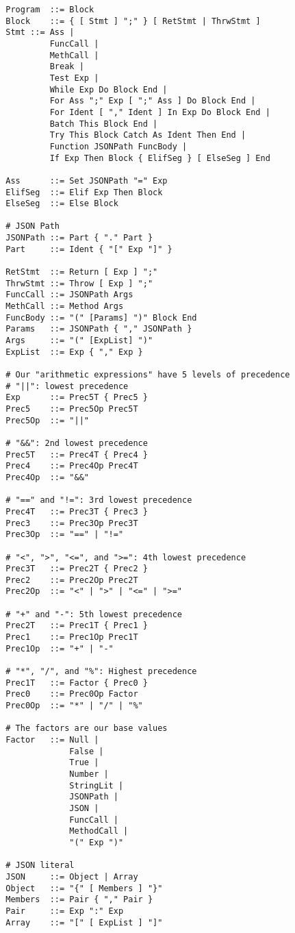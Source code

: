 \documentclass[12pt, letterpaper]{article}
\begin{document}
\begin{center}
    \begin{verbatim}
        Program  ::= Block
        Block    ::= { [ Stmt ] ";" } [ RetStmt | ThrwStmt ]
        Stmt ::= Ass |
                 FuncCall |
                 MethCall |
                 Break |
                 Test Exp |
                 While Exp Do Block End |
                 For Ass ";" Exp [ ";" Ass ] Do Block End |
                 For Ident [ "," Ident ] In Exp Do Block End |
                 Batch This Block End |
                 Try This Block Catch As Ident Then End |
                 Function JSONPath FuncBody |
                 If Exp Then Block { ElifSeg } [ ElseSeg ] End

        Ass      ::= Set JSONPath "=" Exp
        ElifSeg  ::= Elif Exp Then Block
        ElseSeg  ::= Else Block

        # JSON Path
        JSONPath ::= Part { "." Part }
        Part     ::= Ident { "[" Exp "]" }

        RetStmt  ::= Return [ Exp ] ";"
        ThrwStmt ::= Throw [ Exp ] ";"
        FuncCall ::= JSONPath Args
        MethCall ::= Method Args
        FuncBody ::= "(" [Params] ")" Block End
        Params   ::= JSONPath { "," JSONPath }
        Args     ::= "(" [ExpList] ")"
        ExpList  ::= Exp { "," Exp }

        # Our "arithmetic expressions" have 5 levels of precedence
        # "||": lowest precedence
        Exp      ::= Prec5T { Prec5 }
        Prec5    ::= Prec5Op Prec5T
        Prec5Op  ::= "||"

        # "&&": 2nd lowest precedence
        Prec5T   ::= Prec4T { Prec4 }
        Prec4    ::= Prec4Op Prec4T
        Prec4Op  ::= "&&"

        # "==" and "!=": 3rd lowest precedence
        Prec4T   ::= Prec3T { Prec3 }
        Prec3    ::= Prec3Op Prec3T
        Prec3Op  ::= "==" | "!="

        # "<", ">", "<=", and ">=": 4th lowest precedence
        Prec3T   ::= Prec2T { Prec2 }
        Prec2    ::= Prec2Op Prec2T
        Prec2Op  ::= "<" | ">" | "<=" | ">="

        # "+" and "-": 5th lowest precedence
        Prec2T   ::= Prec1T { Prec1 }
        Prec1    ::= Prec1Op Prec1T
        Prec1Op  ::= "+" | "-"

        # "*", "/", and "%": Highest precedence
        Prec1T   ::= Factor { Prec0 }
        Prec0    ::= Prec0Op Factor
        Prec0Op  ::= "*" | "/" | "%"

        # The factors are our base values
        Factor   ::= Null |
                     False |
                     True |
                     Number |
                     StringLit |
                     JSONPath |
                     JSON |
                     FuncCall |
                     MethodCall |
                     "(" Exp ")"

        # JSON literal
        JSON     ::= Object | Array
        Object   ::= "{" [ Members ] "}"
        Members  ::= Pair { "," Pair }
        Pair     ::= Exp ":" Exp
        Array    ::= "[" [ ExpList ] "]"
    \end{verbatim}
\end{center}
\end{document}
